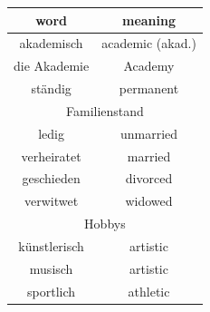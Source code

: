 \begin{center}
    \begin{tabular}{|c|c|}
        \hline
        \rowcolor{gray}
        word         & meaning              \\
        \hline
        akademisch   & academic (akad.)     \\
        die Akademie & Academy              \\
        \hline
        ständig      & permanent            \\
        \hline
        \multicolumn{2}{|c|}{Familienstand} \\
        \hline
        ledig        & unmarried            \\
        verheiratet  & married              \\
        geschieden   & divorced             \\
        verwitwet    & widowed              \\
        \hline
        \multicolumn{2}{|c|}{Hobbys}        \\
        \hline
        künstlerisch & artistic             \\
        musisch      & artistic             \\
        sportlich    & athletic             \\
        \hline
    \end{tabular}
\end{center}

